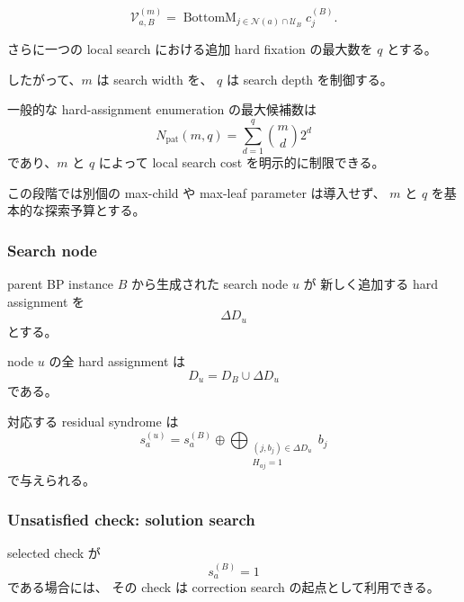 \begin{equation}
    \mathcal{V}_{a,B}^{(m)}
    =
    \operatorname{BottomM}_{
        j\in\mathcal{N}(a)\cap\mathcal{U}_B
    }
    c_j^{(B)}.
    \label{eq:local_variables}
\end{equation}

さらに一つの local search における追加 hard fixation の最大数を
$q$ とする。

したがって、$m$ は search width を、
$q$ は search depth を制御する。

一般的な hard-assignment enumeration の最大候補数は
\begin{equation}
    N_{\mathrm{pat}}(m,q)
    =
    \sum_{d=1}^{q}
    {m\choose d}2^d
\end{equation}
であり、$m$ と $q$ によって local search cost を明示的に制限できる。

この段階では別個の max-child や max-leaf parameter は導入せず、
$m$ と $q$ を基本的な探索予算とする。


\subsubsection{Search node}

parent BP instance $B$ から生成された search node $u$ が
新しく追加する hard assignment を
\begin{equation}
    \Delta D_u
\end{equation}
とする。

node $u$ の全 hard assignment は
\begin{equation}
    D_u
    =
    D_B\cup\Delta D_u
\end{equation}
である。

対応する residual syndrome は
\begin{equation}
    s_a^{(u)}
    =
    s_a^{(B)}
    \oplus
    \bigoplus_{\substack{(j,b_j)\in\Delta D_u\\H_{aj}=1}}
    b_j
    \label{eq:node_residual}
\end{equation}
で与えられる。


\subsubsection{Unsatisfied check: solution search}

selected check が
\begin{equation}
    s_a^{(B)}=1
\end{equation}
である場合には、
その check は correction search の起点として利用できる。

